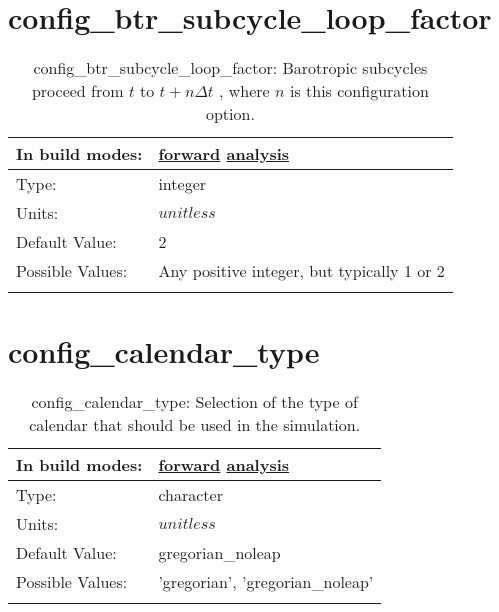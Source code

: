 \section[config\_btr\_subcycle\_loop\_factor]{config\_btr\_subcycle\_loop\_factor}
\label{sec:nm_sec_config_btr_subcycle_loop_factor}
\begin{center}
\begin{longtable}{| p{2.0in} || p{4.0in} |}
    \hline
    In build modes: & \hyperref[subsec:forward_nm_tab_split_explicit_ts]{forward} \hyperref[subsec:analysis_nm_tab_split_explicit_ts]{analysis} \\
    \hline
    Type: & integer \\
    \hline
    Units: & $unitless$ \\
    \hline
    Default Value: & 2 \\
    \hline
    Possible Values: & Any positive integer, but typically 1 or 2 \\
    \hline
    \caption{config\_btr\_subcycle\_loop\_factor:  Barotropic subcycles proceed from  $t$  to  $t+n\Delta t$ , where  $n$  is this configuration option.}
\end{longtable}
\end{center}
\section[config\_calendar\_type]{config\_calendar\_type}
\label{sec:nm_sec_config_calendar_type}
\begin{center}
\begin{longtable}{| p{2.0in} || p{4.0in} |}
    \hline
    In build modes: & \hyperref[subsec:forward_nm_tab_time_management]{forward} \hyperref[subsec:analysis_nm_tab_time_management]{analysis} \\
    \hline
    Type: & character \\
    \hline
    Units: & $unitless$ \\
    \hline
    Default Value: & gregorian\_noleap \\
    \hline
    Possible Values: & 'gregorian', 'gregorian\_noleap' \\
    \hline
    \caption{config\_calendar\_type: Selection of the type of calendar that should be used in the simulation.}
\end{longtable}
\end{center}
